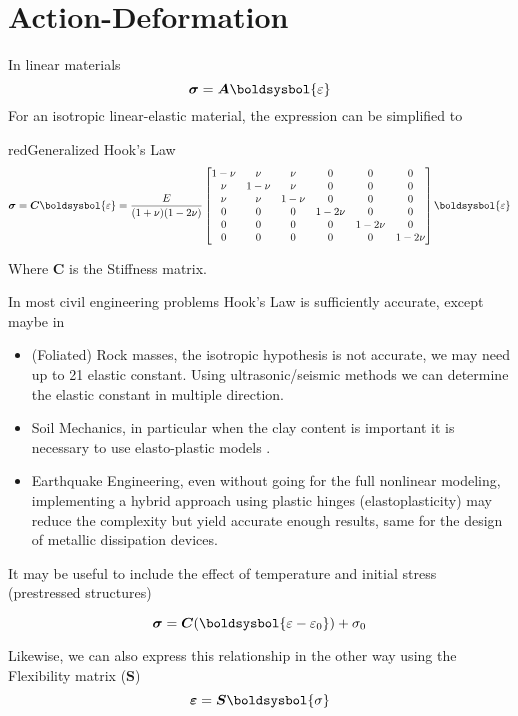\documentclass[a4paper, 11pt,article,oneside]{memoir}%
\begin{document}
\section{Action-Deformation}
In linear materials   
\begin{equation*}\label{HookLaw}
\boldsymbol{\sigma}=\boldsymbol{A}\boldsysbol{\varepsilon}
\end{equation*}
For an isotropic linear-elastic material, the expression can be simplified to

\begin{eqbox2}{red}{Generalized Hook's Law}\
\begin{equation*}
\boldsymbol{\sigma}=\boldsymbol{C}\boldsysbol{\varepsilon}=\frac{E}{(1+\nu)(1-2\nu)}
\begin{bmatrix}
1-\nu&\nu&\nu&0&0&0\\
\nu&1-\nu&\nu&0&0&0\\
\nu&\nu&1-\nu&0&0&0\\
0&0&0&1-2\nu&0&0\\
0&0&0&0&1-2\nu&0\\
0&0&0&0&0&1-2\nu\\
\end{bmatrix}\boldsysbol{\varepsilon}
\end{equation*}
\end{eqbox2}
Where $\boldsymbol{C}$ is the Stiffness matrix.
\begin{note}
In most civil engineering  problems Hook's Law is sufficiently accurate, except  maybe in 
\begin{itemize}
\item (Foliated) Rock masses, the isotropic hypothesis is not accurate, we may need up to 21 elastic constant. Using ultrasonic/seismic methods we can determine the elastic constant in multiple direction\cite{CIVIL448}.
\item Soil Mechanics, in particular when the clay content is important it is necessary to use elasto-plastic models \cite{ICE2614}.
\item Earthquake Engineering, even without going for the full nonlinear modeling, implementing a hybrid approach using plastic hinges (elastoplasticity) may reduce the complexity but yield accurate enough results, same for the design of metallic dissipation devices\cite{CIVIL467}.
\end{itemize}
\end{note}
It may be useful to include the effect of temperature and initial stress (prestressed structures)
\begin{eqbox}
\begin{equation*}
\boldsymbol{\sigma}=\boldsymbol{C}(\boldsysbol{\varepsilon-\varepsilon_0})+\sigma_0
\end{equation*}
\end{eqbox}
Likewise, we can also express this relationship in the other way using the Flexibility matrix ($\boldsymbol{S}$)
\begin{equation*}
\boldsymbol{\varepsilon}=\boldsymbol{S}\boldsysbol{\sigma}
\end{equation*}
\end{document}
